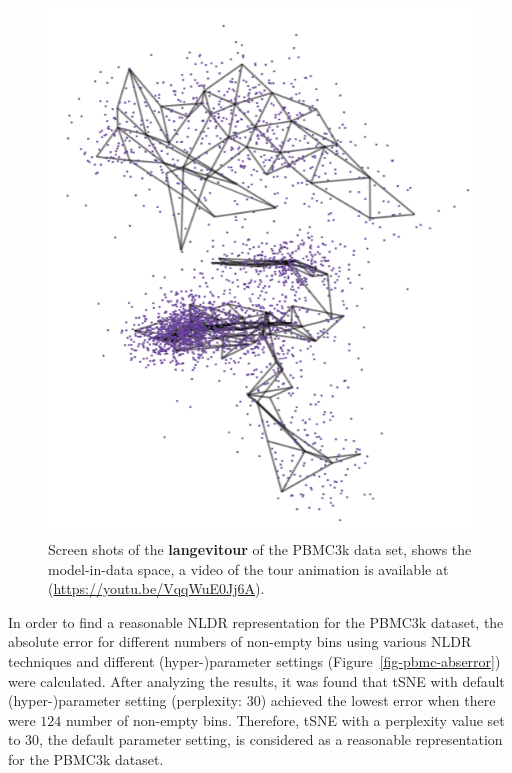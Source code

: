 \documentclass[
  12pt]{article}
\begin{document}
\begin{figure}[H]
%
\begin{minipage}{0.33\linewidth}
\includegraphics{figures/pbmc3k/sc_3.png}\end{minipage}%

\caption{\label{fig-pbmc1-sc}Screen shots of the \textbf{langevitour} of
the PBMC3k data set, shows the model-in-data space, a video of the tour
animation is available at (\url{https://youtu.be/VqqWuE0Jj6A}).}

\end{figure}%

In order to find a reasonable NLDR representation for the PBMC3k
dataset, the absolute error for different numbers of non-empty bins
using various NLDR techniques and different (hyper-)parameter settings
(Figure~\ref{fig-pbmc-abserror}) were calculated. After analyzing the
results, it was found that tSNE with default (hyper-)parameter setting
(perplexity: \(30\)) achieved the lowest error when there were \(124\)
number of non-empty bins. Therefore, tSNE with a perplexity value set to
\(30\), the default parameter setting, is considered as a reasonable
representation for the PBMC3k dataset.
\end{document}
